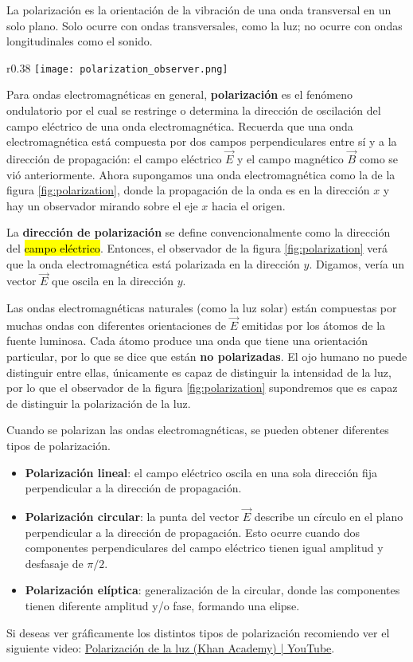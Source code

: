La polarización es la orientación de la vibración de una onda transversal en un solo plano. Solo ocurre con ondas transversales, como la luz; no ocurre con ondas longitudinales como el sonido.

\begin{wrapfigure}{r}{0.38\textwidth}
  \centering
  \texttt{[image: polarization\_observer.png]}
  \caption{Posición del observador con respecto a la onda electromagnética.}
  \label{fig:polarization}
\end{wrapfigure}
Para ondas electromagnéticas en general, \textbf{polarización} es el fenómeno ondulatorio por el cual se restringe o determina la dirección de oscilación del campo eléctrico de una onda electromagnética. Recuerda que una onda electromagnética está compuesta por dos campos perpendiculares entre sí y a la dirección de propagación: el campo eléctrico \(\vec{E}\) y el campo magnético \(\vec{B}\) como se vió anteriormente. Ahora supongamos una onda electromagnética como la de la figura \ref{fig:polarization}, donde la propagación de la onda es en la dirección \(x\) y hay un observador mirando sobre el eje \(x\) hacia el origen.

La \textbf{dirección de polarización} se define convencionalmente como la dirección del \hl{campo eléctrico}. Entonces, el observador de la figura \ref{fig:polarization} verá que la onda electromagnética está polarizada en la dirección \(y\). Digamos, vería un vector \(\vec{E}\) que oscila en la dirección \(y\).

Las ondas electromagnéticas naturales (como la luz solar) están compuestas por muchas ondas con diferentes orientaciones de \(\vec{E}\) emitidas por los átomos de la fuente luminosa. Cada átomo produce una onda que tiene una orientación particular, por lo que se dice que están \textbf{no polarizadas}. El ojo humano no puede distinguir entre ellas, únicamente es capaz de distinguir la intensidad de la luz, por lo que el observador de la figura \ref{fig:polarization} supondremos que es capaz de distinguir la polarización de la luz.

Cuando se polarizan las ondas electromagnéticas, se pueden obtener diferentes tipos de polarización.
\begin{itemize}
  \item \textbf{Polarización lineal}: el campo eléctrico oscila en una sola dirección fija perpendicular a la dirección de propagación.
  \item \textbf{Polarización circular}: la punta del vector \(\vec{E}\) describe un círculo en el plano perpendicular a la dirección de propagación. Esto ocurre cuando dos componentes perpendiculares del campo eléctrico tienen igual amplitud y desfasaje de \(\pi/2\).
  \item \textbf{Polarización elíptica}: generalización de la circular, donde las componentes tienen diferente amplitud y/o fase, formando una elipse.
\end{itemize}
Si deseas ver gráficamente los distintos tipos de polarización recomiendo ver el siguiente video: \href{https://www.youtube.com/watch?v=PMjADwpLlfs}{Polarización de la luz (Khan Academy) | YouTube}.

